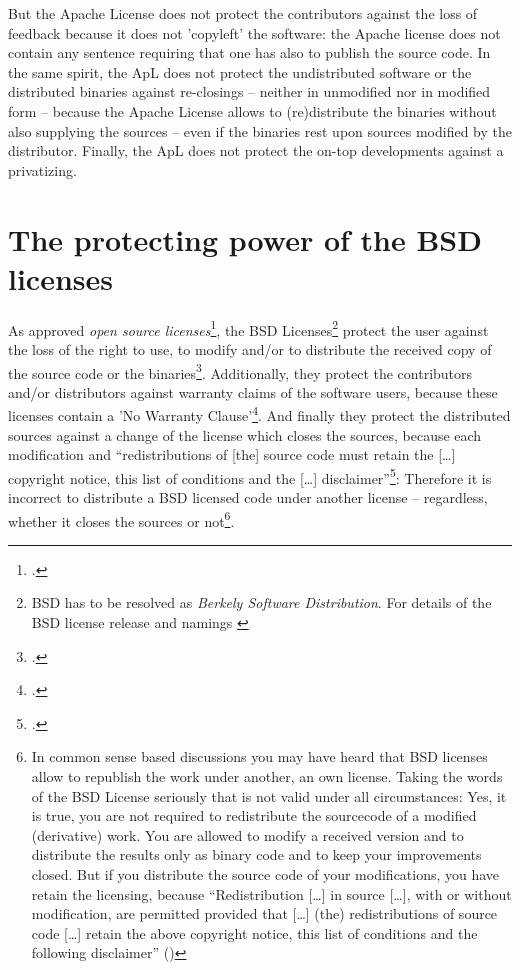 But the Apache License does not protect the contributors against the loss of
feedback because it does not 'copyleft' the software: the Apache license does
not contain any sentence requiring that one has also to publish the source code.
In the same spirit, the ApL does not protect the undistributed software or the
distributed binaries against re-closings -- neither in unmodified nor in
modified form -- because the Apache License allows to (re)distribute the
binaries without also supplying the sources -- even if the binaries rest upon
sources modified by the distributor. Finally, the ApL does not protect the
on-top developments against a privatizing.


\section{The protecting power of the BSD licenses}
\label{sec:ProtectingPowerOfBsd}

As approved \emph{open source licenses}\footcite[cf.][\nopage wp]{OSI2012b}, the
BSD Licenses\footnote{BSD has to be resolved as \emph{Berkely Software
Distribution}. For details of the BSD license release and namings
\cite[cf.][\nopage wp.\ editorial]{BsdLicense3Clause}} protect the user against
the loss of the right to use, to modify and/or to distribute the received copy
of the source code or the binaries\footcite[cf.][\nopage wp. §1ff]{OSI2012a}.
Additionally, they protect the contributors and/or distributors against warranty
claims of the software users, because these licenses contain a 'No Warranty
Clause'\footcite[one for all version cf.][\nopage wp]{BsdLicense2Clause}. And
finally they protect the distributed sources against a change of the license
which closes the sources, because each modification and \enquote{redistributions
of [the] source code must retain the [\ldots] copyright notice, this list of
conditions and the [\ldots] disclaimer}\footcite[cf.][\nopage
wp]{BsdLicense2Clause}: Therefore it is incorrect to distribute a BSD licensed
code under another license -- regardless, whether it closes the sources or
not\footnote{In common sense based discussions you may have heard that BSD
licenses allow to republish the work under another, an own license. Taking the
words of the BSD License seriously that is not valid under all circumstances:
Yes, it is true, you are not required to redistribute the sourcecode of a
modified (derivative) work. You are allowed to modify a received version and to
distribute the results only as binary code and to keep your improvements closed.
But if you distribute the source code of your modifications, you have retain the
licensing, because \enquote{Redistribution [\ldots] in source [\ldots], with or
without modification, are permitted provided that [\ldots] (the) redistributions
of source code [\ldots] retain the above copyright notice, this list of
conditions and the following disclaimer} (\cite[cf.][\nopage
wp]{BsdLicense2Clause})}.


